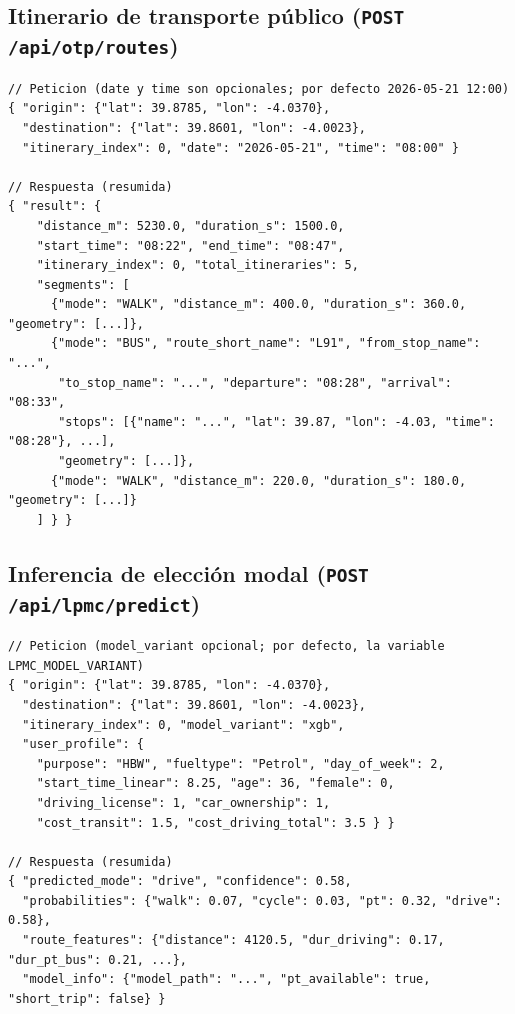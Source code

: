 \subsection{Itinerario de transporte público (\texttt{POST /api/otp/routes})}

\begin{lstlisting}
// Peticion (date y time son opcionales; por defecto 2026-05-21 12:00)
{ "origin": {"lat": 39.8785, "lon": -4.0370},
  "destination": {"lat": 39.8601, "lon": -4.0023},
  "itinerary_index": 0, "date": "2026-05-21", "time": "08:00" }

// Respuesta (resumida)
{ "result": {
    "distance_m": 5230.0, "duration_s": 1500.0,
    "start_time": "08:22", "end_time": "08:47",
    "itinerary_index": 0, "total_itineraries": 5,
    "segments": [
      {"mode": "WALK", "distance_m": 400.0, "duration_s": 360.0, "geometry": [...]},
      {"mode": "BUS", "route_short_name": "L91", "from_stop_name": "...",
       "to_stop_name": "...", "departure": "08:28", "arrival": "08:33",
       "stops": [{"name": "...", "lat": 39.87, "lon": -4.03, "time": "08:28"}, ...],
       "geometry": [...]},
      {"mode": "WALK", "distance_m": 220.0, "duration_s": 180.0, "geometry": [...]}
    ] } }
\end{lstlisting}

\subsection{Inferencia de elección modal (\texttt{POST /api/lpmc/predict})}

\begin{lstlisting}
// Peticion (model_variant opcional; por defecto, la variable LPMC_MODEL_VARIANT)
{ "origin": {"lat": 39.8785, "lon": -4.0370},
  "destination": {"lat": 39.8601, "lon": -4.0023},
  "itinerary_index": 0, "model_variant": "xgb",
  "user_profile": {
    "purpose": "HBW", "fueltype": "Petrol", "day_of_week": 2,
    "start_time_linear": 8.25, "age": 36, "female": 0,
    "driving_license": 1, "car_ownership": 1,
    "cost_transit": 1.5, "cost_driving_total": 3.5 } }

// Respuesta (resumida)
{ "predicted_mode": "drive", "confidence": 0.58,
  "probabilities": {"walk": 0.07, "cycle": 0.03, "pt": 0.32, "drive": 0.58},
  "route_features": {"distance": 4120.5, "dur_driving": 0.17, "dur_pt_bus": 0.21, ...},
  "model_info": {"model_path": "...", "pt_available": true, "short_trip": false} }
\end{lstlisting}

